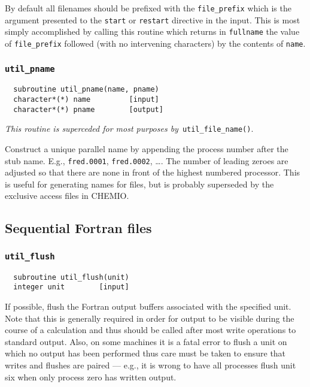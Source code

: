 By default all filenames should be prefixed
with the \verb+file_prefix+ which is the argument presented to the
\verb+start+ or \verb+restart+ directive in the input.  This is most
simply accomplished by calling this routine which returns in
\verb+fullname+ the value of \verb+file_prefix+ followed (with no
intervening characters) by the contents of \verb+name+.

\subsubsection{{\tt util\_pname}}
\begin{verbatim}
  subroutine util_pname(name, pname)
  character*(*) name         [input]
  character*(*) pname        [output]
\end{verbatim}
{\em This routine is superceded for most purposes by}\ 
\verb+util_file_name()+.  

Construct a unique parallel name by appending the process number after
the stub name. E.g., \verb+fred.0001+, \verb+fred.0002+, \ldots. The
number of leading zeroes are adjusted so that there are none in front
of the highest numbered processor.  This is useful for generating
names for files, but is probably superseded by the exclusive access
files in CHEMIO.

\subsection{Sequential Fortran files}

\subsubsection{{\tt util\_flush}}
\begin{verbatim}
  subroutine util_flush(unit)
  integer unit        [input]
\end{verbatim}
If possible, flush the Fortran output buffers associated with the
specified unit.  Note that this is generally required in order for
output to be visible during the course of a calculation and thus
should be called after most write operations to standard output.
Also, on some machines it is a fatal error to flush a unit on which no
output has been performed thus care must be taken to ensure that
writes and flushes are paired --- e.g., it is wrong to have all
processes flush unit six when only process zero has written output.

